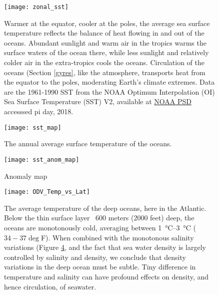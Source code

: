 {\newpage
\begin{figure}[p]
\centering
  \texttt{[image: zonal\_sst]}%
\caption{Warmer at the equator, cooler at the poles, the average sea surface temperature reflects the balance of heat flowing in and out of the oceans. Abundant sunlight and warm air in the tropics warms the surface waters of the ocean there, while less sunlight and relatively colder air in the extra-tropics cools the oceans. Circulation of the oceans (Section \ref{gyres}, like the atmosphere, transports heat from the equator to the poles, moderating Earth's climate extremes. Data are the 1961-1990 SST from the NOAA Optimum Interpolation (OI) Sea Surface Temperature (SST) V2, available at \href{https://www.esrl.noaa.gov/psd/data/gridded/data.noaa.oisst.v2.html}{NOAA PSD} accesssed pi day, 2018.}
\label{fig:zonal_sst}
\end{figure}

\newpage
\begin{figure}[p]
\centering
  \texttt{[image: sst\_map]}%
\caption{The annual average surface temperature of the oceans.}
\label{fig:sst_map}
\end{figure}


\begin{figure}[p]
\centering
  \texttt{[image: sst\_anom\_map]}%
\caption{Anomaly map}
\label{fig:sst_anom_map}
\end{figure}



\newpage
\begin{figure}[p]
\centering
  \texttt{[image: ODV\_Temp\_vs\_Lat]}%
\caption{The average temperature of the deep oceans, here in the Atlantic. Below the thin surface layer ~600 meters (2000 feet) deep, the oceans are monotonously cold, averaging between \SIrange{1}{3}{\celsius} ($34-37 \deg$F). When combined with the monotonous salinity variations (Figure \ref{fig:salinity_sect}, and the fact that sea water density is largely controlled by salinity and density, we conclude that density variations in the deep ocean must be subtle. Tiny difference in temperature and salinity can have profound effects on density, and hence circulation, of seawater.}
\label{fig:salinity_sect}
\end{figure}

}
